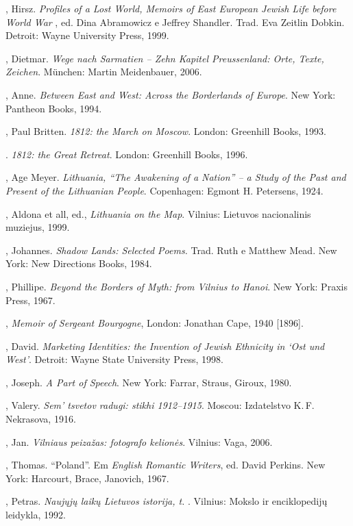 \begin{bibliohedra}
 , Hirsz. \emph{Profiles of a Lost World, Memoirs of East
  European Jewish Life before World War }, ed. Dina Abramowicz e
  Jeffrey Shandler. Trad. Eva Zeitlin Dobkin. Detroit: Wayne University
  Press, 1999.

  , Dietmar. \emph{Wege nach Sarmatien -- Zehn Kapitel
  Preussenland: Orte, Texte, Zeichen}. München: Martin Meidenbauer,
  2006.

  , Anne. \emph{Between East and West: Across the Borderlands
  of Europe}. New York: Pantheon Books, 1994.

  , Paul Britten. \emph{1812: the March on Moscow}. London:
  Greenhill Books, 1993.

  \titidem. \emph{1812: the Great Retreat}. London:
  Greenhill Books, 1996.

  , Age Meyer. \emph{Lithuania, ``The Awakening of a Nation''
  -- a Study of the Past and Present of the Lithuanian People}.
  Copenhagen: Egmont H. Petersens, 1924.

  , Aldona et all, ed., \emph{Lithuania on the Map}. Vilnius:
  Lietuvos nacionalinis muziejus, 1999.

  , Johannes. \emph{Shadow Lands: Selected Poems.} Trad. Ruth e
  Matthew Mead. New York: New Directions Books, 1984.

  , Phillipe. \emph{Beyond the Borders of Myth: from Vilnius to
  Hanoi}. New York: Praxis Press, 1967.

  , \emph{Memoir of Sergeant Bourgogne}, London: Jonathan Cape,
  1940 {[}1896{]}.

  , David. \emph{Marketing Identities: the Invention of Jewish
  Ethnicity in `Ost und West'}. Detroit: Wayne State University Press,
  1998.

  , Joseph. \emph{A Part of Speech}. New York: Farrar, Straus,
  Giroux, 1980.

  , Valery. \emph{Sem' tsvetov radugi: stikhi 1912--1915}. Moscou:
  Izdatelstvo K.\,F. Nekrasova, 1916.

  , Jan. \emph{Vilniaus peizažas: fotografo kelionės}. Vilnius:
  Vaga, 2006.

  , Thomas. ``Poland''. Em \emph{English Romantic Writers}, ed.
  David Perkins. New York: Harcourt, Brace, Janovich, 1967.

  , Petras. \emph{Naujųjų laikų Lietuvos istorija, t. }.
  Vilnius: Mokslo ir enciklopedijų leidykla, 1992.


\end{bibliohedra}
